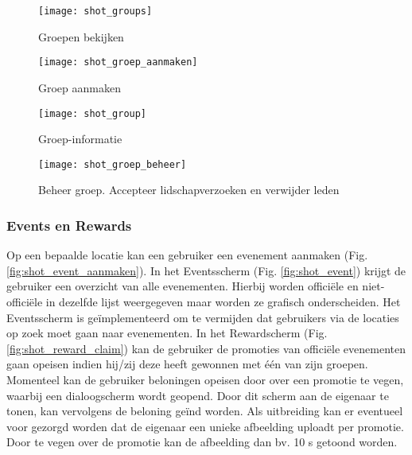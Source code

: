 \begin{figure}[ht]

\begin{minipage}[b]{0.25\linewidth}
\centering
\texttt{[image: shot\_groups]}
\caption{Groepen bekijken}
\label{fig:shot_groups}
\end{minipage}
\hspace{1cm}
\begin{minipage}[b]{0.25\linewidth}
\centering
\texttt{[image: shot\_groep\_aanmaken]}
\caption{Groep aanmaken}
\label{fig:shot_groep_aanmaken}
\end{minipage}
\hspace{1cm}
\begin{minipage}[b]{0.25\linewidth}
\centering
\texttt{[image: shot\_group]}
\caption{Groep-informatie}
\label{fig:shot_group}
\end{minipage}

\end{figure}

\begin{figure}[ht]
\centering
\begin{minipage}[b]{0.5\linewidth}
\centering
\texttt{[image: shot\_groep\_beheer]}
\caption{Beheer groep. Accepteer lidschapverzoeken en verwijder leden}
\label{fig:shot_groep_beheer}
\end{minipage}


\end{figure}

\clearpage

\subsubsection{Events en Rewards}%
Op een bepaalde locatie kan een gebruiker een evenement aanmaken (Fig. \ref{fig:shot_event_aanmaken}).
In het Eventsscherm (Fig. \ref{fig:shot_event}) krijgt de gebruiker een overzicht van alle evenementen. Hierbij worden officiële en niet-officiële in dezelfde lijst weergegeven maar worden ze grafisch onderscheiden. Het Eventsscherm is geïmplementeerd om te vermijden dat gebruikers via de locaties op zoek moet gaan naar evenementen.
In het Rewardscherm (Fig. \ref{fig:shot_reward_claim}) kan de gebruiker de promoties van officiële evenementen gaan opeisen indien hij/zij deze heeft gewonnen met één van zijn groepen. Momenteel kan de gebruiker beloningen opeisen door over een promotie te vegen, waarbij een dialoogscherm wordt geopend. Door dit scherm aan de eigenaar te tonen, kan vervolgens de beloning geïnd worden. Als uitbreiding kan er eventueel voor gezorgd worden dat de eigenaar een unieke afbeelding uploadt per promotie. Door te vegen over de promotie kan de afbeelding dan bv. 10 s getoond worden.
